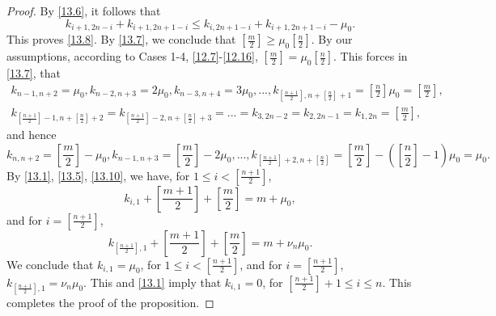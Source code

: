 \documentclass[12pts]{amsart}
\begin{document}
\begin{proof}
By \eqref{13.6}, it follows that
$$
k_{i+1,2n-i}+k_{i+1,2n+1-i}\leq k_{i,2n+1-i}+k_{i+1,2n+1-i}-\mu_0.
$$
This proves \eqref{13.8}. By \eqref{13.7}, we conclude that $[\frac{m}{2}]\geq \mu_0[\frac{n}{2}]$. By our assumptions, according to Cases 1-4, \eqref{12.7}-\eqref{12.16}, $[\frac{m}{2}]= \mu_0[\frac{n}{2}]$. This forces in \eqref{13.7}, that
\begin{multline}\label{13.10}
k_{n-1,n+2}=\mu_0, k_{n-2,n+3}=2\mu_0, k_{n-3,n+4}=3\mu_0,..., k_{[\frac{n+1}{2}],n+[\frac{n}{2}]+1}=[\frac{n}{2}]\mu_0=[\frac{m}{2}],\\
k_{[\frac{n+1}{2}]-1,n+[\frac{n}{2}]+2}=k_{[\frac{n+1}{2}]-2,n+[\frac{n}{2}]+3}=...=k_{3,2n-2}=k_{2,2n-1}=k_{1,2n}=[\frac{m}{2}],
\end{multline}
and hence
$$ k_{n,n+2}=[\frac{m}{2}]-\mu_0, k_{n-1,n+3}=[\frac{m}{2}]-2\mu_0,...,k_{[\frac{n+1}{2}]+2,n+[\frac{n}{2}]}=[\frac{m}{2}]-([\frac{n}{2}]-1)\mu_0=\mu_0.
$$
By \eqref{13.1}, \eqref{13.5}, \eqref{13.10}, we have, for $1\leq i< [\frac{n+1}{2}]$,
$$
k_{i,1}+[\frac{m+1}{2}]+[\frac{m}{2}]=m+\mu_0,
$$
and for $i=[\frac{n+1}{2}]$,
$$
k_{[\frac{n+1}{2}],1}+[\frac{m+1}{2}]+[\frac{m}{2}]=m+\nu_n \mu_0.
$$
We conclude that $k_{i,1}=\mu_0$, for $1\leq i< [\frac{n+1}{2}]$, and for $i=[\frac{n+1}{2}]$, $k_{[\frac{n+1}{2}],1}=\nu_n\mu_0$. This and \eqref{13.1} imply that $k_{i,1}=0$, for $[\frac{n+1}{2}]+1\leq i\leq n$. This completes the proof of the proposition.
	
\end{proof}	
\end{document}
